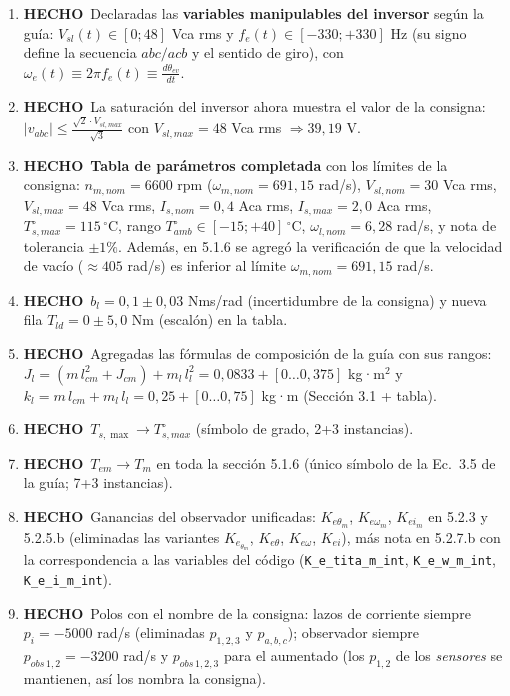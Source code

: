 \documentclass[11pt,a4paper]{article}
\newcommand{\hecho}{\textcolor{okgreen}{\textbf{HECHO}}}
\begin{document}
\begin{enumerate}[label=\textbf{ID \arabic*.}, leftmargin=1.6cm]
  \item \hecho\ Declaradas las \textbf{variables manipulables del inversor} según la guía: $V_{sl}(t)\in[0;48]$ Vca rms y $f_e(t)\in[-330;+330]$ Hz (su signo define la secuencia $abc/acb$ y el sentido de giro), con $\omega_e(t)\equiv 2\pi f_e(t)\equiv \frac{d\theta_{ev}}{dt}$.
  \item \hecho\ La saturación del inversor ahora muestra el valor de la consigna: $|v_{abc}|\le\frac{\sqrt{2}\cdot V_{sl,max}}{\sqrt{3}}$ con $V_{sl,max}=48$ Vca rms $\Rightarrow 39{,}19$ V.
  \item \hecho\ \textbf{Tabla de parámetros completada} con los límites de la consigna: $n_{m,nom}=6600$ rpm ($\omega_{m,nom}=691{,}15$ rad/s), $V_{sl,nom}=30$ Vca rms, $V_{sl,max}=48$ Vca rms, $I_{s,nom}=0{,}4$ Aca rms, $I_{s,max}=2{,}0$ Aca rms, $T^\circ_{s,max}=115\,^\circ$C, rango $T^\circ_{amb}\in[-15;+40]\,^\circ$C, $\omega_{l,nom}=6{,}28$ rad/s, y nota de tolerancia $\pm 1\%$. Además, en 5.1.6 se agregó la verificación de que la velocidad de vacío ($\approx 405$ rad/s) es inferior al límite $\omega_{m,nom}=691{,}15$ rad/s.
  \item \hecho\ $b_l = 0{,}1 \pm 0{,}03$ Nms/rad (incertidumbre de la consigna) y nueva fila $T_{ld}=0\pm 5{,}0$ Nm (escalón) en la tabla.
  \item \hecho\ Agregadas las fórmulas de composición de la guía con sus rangos: $J_l=(m\,l_{cm}^2+J_{cm})+m_l\,l_l^2 = 0{,}0833+[0\ldots 0{,}375]$ kg·m$^2$ y $k_l=m\,l_{cm}+m_l\,l_l = 0{,}25+[0\ldots 0{,}75]$ kg·m (Sección 3.1 + tabla).
  \setcounter{enumi}{19}
  \item \hecho\ $T_{s,\max}\to T^\circ_{s,max}$ (símbolo de grado, 2+3 instancias).
  \item \hecho\ $T_{em}\to T_m$ en toda la sección 5.1.6 (único símbolo de la Ec.\ 3.5 de la guía; 7+3 instancias).
  \setcounter{enumi}{22}
  \item \hecho\ Ganancias del observador unificadas: $K_{e\theta_m}$, $K_{e\omega_m}$, $K_{ei_m}$ en 5.2.3 y 5.2.5.b (eliminadas las variantes $K_{e_{\theta_m}}$, $K_{e\theta}$, $K_{e\omega}$, $K_{ei}$), más nota en 5.2.7.b con la correspondencia a las variables del código (\texttt{K\_e\_tita\_m\_int}, \texttt{K\_e\_w\_m\_int}, \texttt{K\_e\_i\_m\_int}).
  \item \hecho\ Polos con el nombre de la consigna: lazos de corriente siempre $p_i=-5000$ rad/s (eliminadas $p_{1,2,3}$ y $p_{a,b,c}$); observador siempre $p_{obs\,1,2}=-3200$ rad/s y $p_{obs\,1,2,3}$ para el aumentado (los $p_{1,2}$ de los \emph{sensores} se mantienen, así los nombra la consigna).

\end{enumerate}
\end{document}
